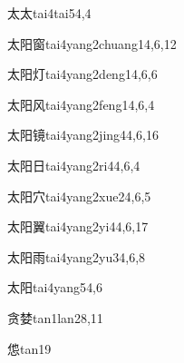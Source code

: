 \begin{verbete}{太太}{tai4tai5}{4,4}
\end{verbete}

\begin{verbete}{太阳窗}{tai4yang2chuang1}{4,6,12}
\end{verbete}

\begin{verbete}{太阳灯}{tai4yang2deng1}{4,6,6}
\end{verbete}

\begin{verbete}{太阳风}{tai4yang2feng1}{4,6,4}
\end{verbete}

\begin{verbete}{太阳镜}{tai4yang2jing4}{4,6,16}
\end{verbete}

\begin{verbete}{太阳日}{tai4yang2ri4}{4,6,4}
\end{verbete}

\begin{verbete}{太阳穴}{tai4yang2xue2}{4,6,5}
\end{verbete}

\begin{verbete}{太阳翼}{tai4yang2yi4}{4,6,17}
\end{verbete}

\begin{verbete}{太阳雨}{tai4yang2yu3}{4,6,8}
\end{verbete}

\begin{verbete}{太阳}{tai4yang5}{4,6}
\end{verbete}

\begin{verbete}{贪婪}{tan1lan2}{8,11}
\end{verbete}

\begin{verbete}{怹}{tan1}{9}
\end{verbete}

